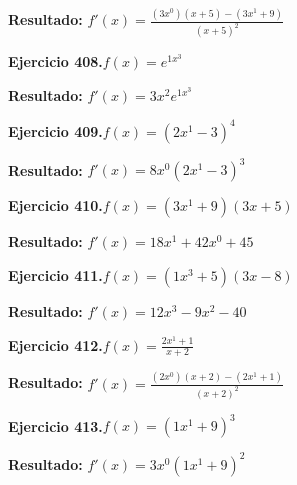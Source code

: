 \documentclass[10pt,a4paper]{article}
\begin{document}
\begin{solbox}
\textbf{Resultado:} \(\displaystyle f'(x) = \frac{(3x^{0})(x+5) - (3x^{1} +9)}{(x+5)^2}\)
\end{solbox}

\begin{ejbox}
\textbf{Ejercicio 408.}\quad $f(x) = e^{1x^{3}}$
\end{ejbox}

\begin{solbox}
\textbf{Resultado:} \(\displaystyle f'(x) = 3x^{2}e^{1x^{3}}\)
\end{solbox}

\newpage
\begin{ejbox}
\textbf{Ejercicio 409.}\quad $f(x) = (2x^{1} -3)^{4}$
\end{ejbox}

\begin{solbox}
\textbf{Resultado:} \(\displaystyle f'(x) = 8x^{0}(2x^{1} -3)^{3}\)
\end{solbox}

\begin{ejbox}
\textbf{Ejercicio 410.}\quad $f(x) = (3x^{1} +9)(3x +5)$
\end{ejbox}

\begin{solbox}
\textbf{Resultado:} \(\displaystyle f'(x) = 18x^{1} +42x^{0} +45\)
\end{solbox}

\begin{ejbox}
\textbf{Ejercicio 411.}\quad $f(x) = (1x^{3} +5)(3x -8)$
\end{ejbox}

\begin{solbox}
\textbf{Resultado:} \(\displaystyle f'(x) = 12x^{3} -9x^{2} -40\)
\end{solbox}

\newpage
\begin{ejbox}
\textbf{Ejercicio 412.}\quad $f(x) = \frac{2x^{1} +1}{x + 2}$
\end{ejbox}

\begin{solbox}
\textbf{Resultado:} \(\displaystyle f'(x) = \frac{(2x^{0})(x+2) - (2x^{1} +1)}{(x+2)^2}\)
\end{solbox}

\begin{ejbox}
\textbf{Ejercicio 413.}\quad $f(x) = (1x^{1} +9)^{3}$
\end{ejbox}

\begin{solbox}
\textbf{Resultado:} \(\displaystyle f'(x) = 3x^{0}(1x^{1} +9)^{2}\)
\end{solbox}
\end{document}
